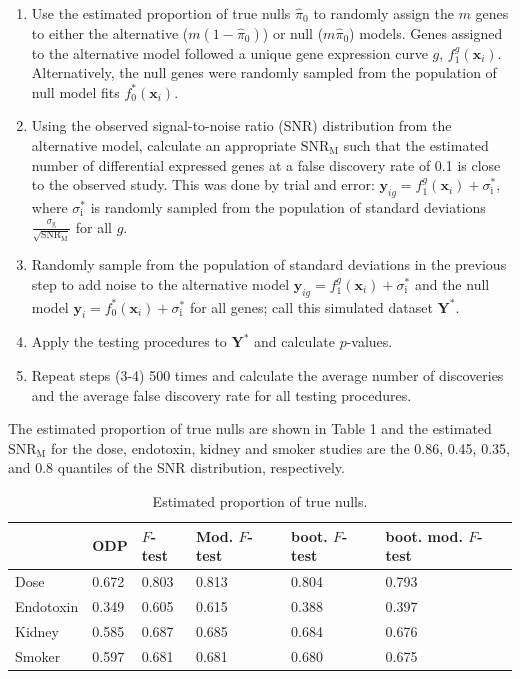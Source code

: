 \documentclass[11pt]{article}
\begin{document}
\begin{enumerate}
\item Use the estimated proportion of true nulls $\hat{\pi}_{0}$ to randomly assign the $m$ genes to either the alternative ($m(1-\hat{\pi}_{0})$) or null ($m\hat{\pi}_{0}$) models. Genes assigned to the alternative model followed a unique gene expression curve $g$, $f_{1}^{g}(\mathbf{x}_{i})$. Alternatively, the null genes were randomly sampled from the population of null model fits $f_{0}^{*}(\mathbf{x}_{i})$.
\item Using the observed signal-to-noise ratio (SNR) distribution from the alternative model, calculate an appropriate $\text{SNR}_{\text{M}}$ such that the estimated number of differential expressed genes at a false discovery rate of 0.1 is close to the observed study. This was done by trial and error: $\mathbf{y}_{ig} = f_{1}^{g}(\mathbf{x}_{i}) + \sigma^{*}_{\text{i}}$, where $\sigma^{*}_{\text{i}}$ is randomly sampled from the population of standard deviations $\frac{\sigma_{\text{g}}}{\sqrt{\text{SNR}_{\text{M}}}}$ for all $g$.
\item Randomly sample from the population of standard deviations in the previous step to add noise to the alternative model $\mathbf{y}_{ig} = f_{1}^{g}(\mathbf{x}_{i}) + \sigma^{*}_{\text{i}}$ and the null model $\mathbf{y}_{i} = f_{0}^{*}(\mathbf{x}_{i}) + \sigma^{*}_{\text{i}}$ for all genes; call this simulated dataset $\mathbf{Y}^{*}$.
\item Apply the testing procedures to $\mathbf{Y}^{*}$ and calculate $p$-values.
\item Repeat steps (3-4) 500 times and calculate the average number of discoveries and the average false discovery rate for all testing procedures.
\end{enumerate}

The estimated proportion of true nulls are shown in Table 1 and the estimated $\text{SNR}_{\text{M}}$ for the dose, endotoxin, kidney and smoker studies are the 0.86, 0.45, 0.35, and 0.8 quantiles of the SNR distribution, respectively. 

\begin{table}
\centering
\begin{tabular}{|l|l|l|l|l|l|}
\hline
          & ODP   & $F$-test & Mod. $F$-test  & boot. $F$-test & boot. mod. $F$-test \\ \hline
Dose      & 0.672 & 0.803 & 0.813 & 0.804         & 0.793         \\ \hline
Endotoxin & 0.349 & 0.605 & 0.615 & 0.388         & 0.397          \\ \hline
Kidney    & 0.585 & 0.687 & 0.685 & 0.684         & 0.676          \\ \hline
Smoker    & 0.597 & 0.681 & 0.681 & 0.680         & 0.675          \\ \hline
\end{tabular}
\caption{Estimated proportion of true nulls.}
\label{tab:pi0}
\end{table}
\end{document}
